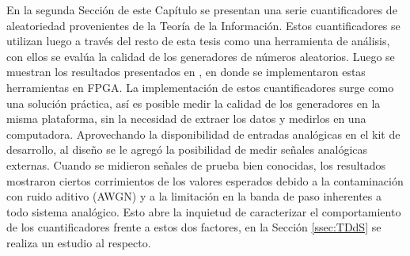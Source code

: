 En la segunda Sección de este Capítulo se presentan una serie cuantificadores de aleatoriedad provenientes de la Teoría de la Información.
Estos cuantificadores se utilizan luego a través del resto de esta tesis como una herramienta de análisis, con ellos se evalúa la calidad de los generadores de números aleatorios.
Luego se muestran los resultados presentados en \cite{Antonelli2016}, en donde se implementaron estas herramientas en FPGA.
La implementación de estos cuantificadores surge como una solución práctica, así es posible medir la calidad de los generadores en la misma plataforma, sin la necesidad de extraer los datos y medirlos en una computadora.
Aprovechando la disponibilidad de entradas analógicas en el kit de desarrollo, al diseño se le agregó la posibilidad de medir señales analógicas externas.
Cuando se midieron señales de prueba bien conocidas, los resultados mostraron ciertos corrimientos de los valores esperados debido a la contaminación con ruido aditivo (AWGN) y a la limitación en la banda de paso inherentes a todo sistema analógico.
Esto abre la inquietud de caracterizar el comportamiento de los cuantificadores frente a estos dos factores, en la Sección \ref{ssec:TDdS} se realiza un estudio al respecto.